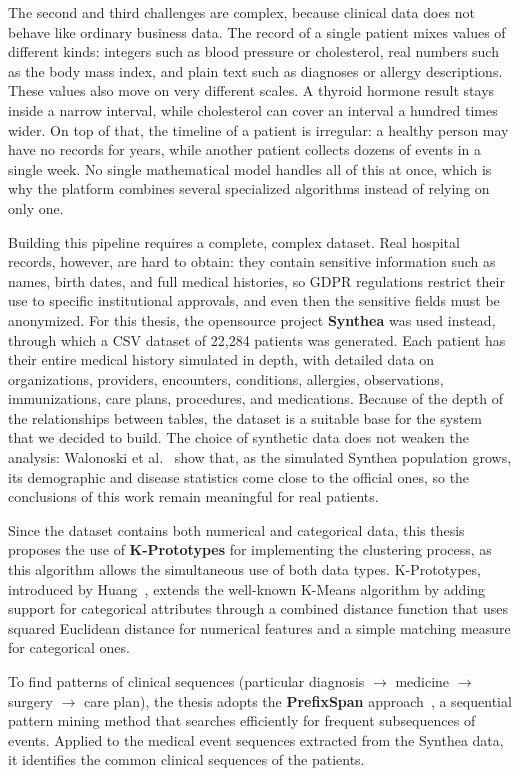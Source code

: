 The second and third challenges are complex, because clinical data does not behave like ordinary business data.
The record of a single patient mixes values of different kinds: integers such as blood pressure or cholesterol, real numbers such as the body mass index, and plain text such as diagnoses or allergy descriptions.
These values also move on very different scales. A thyroid hormone result stays inside a narrow interval, while cholesterol can cover an interval a hundred times wider.
On top of that, the timeline of a patient is irregular: a healthy person may have no records for years, while another patient collects dozens of events in a single week.
No single mathematical model handles all of this at once, which is why the platform combines several specialized algorithms instead of relying on only one.

Building this pipeline requires a complete, complex dataset.
Real hospital records, however, are hard to obtain: they contain sensitive information such as names, birth dates, and full medical histories, so GDPR regulations restrict their use to specific institutional approvals, and even then the sensitive fields must be anonymized.
For this thesis, the opensource project \textbf{Synthea} was used instead, through which a CSV dataset of 22,284 patients was generated. Each patient has their entire medical history simulated in depth, with detailed data on organizations, providers, encounters, conditions, allergies, observations, immunizations, care plans, procedures, and medications.
Because of the depth of the relationships between tables, the dataset is a suitable base for the system that we decided to build.
The choice of synthetic data does not weaken the analysis: Walonoski et al.~\cite{walonoski2017} show that, as the simulated Synthea population grows, its demographic and disease statistics come close to the official ones, so the conclusions of this work remain meaningful for real patients.

Since the dataset contains both numerical and categorical data, this thesis proposes the use of \textbf{K-Prototypes} for implementing the clustering process, as this algorithm allows the simultaneous use of both data types.
K-Prototypes, introduced by Huang~\cite{huang1998}, extends the well-known K-Means algorithm by adding support for categorical attributes through a combined distance function that uses squared Euclidean distance for numerical features and a simple matching measure for categorical ones.

To find patterns of clinical sequences (particular diagnosis $\rightarrow$ medicine $\rightarrow$ surgery $\rightarrow$ care plan), the thesis adopts the \textbf{PrefixSpan} approach~\cite{pei2001}, a sequential pattern mining method that searches efficiently for frequent subsequences of events.
Applied to the medical event sequences extracted from the Synthea data, it identifies the common clinical sequences of the patients.


